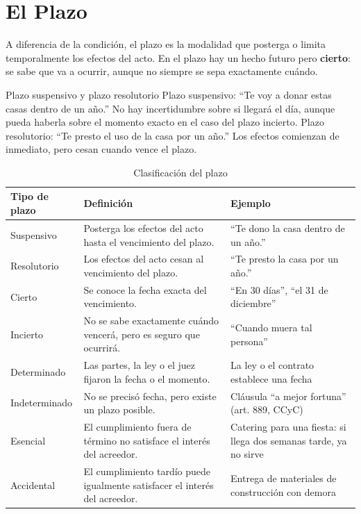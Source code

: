 \documentclass[12pt,oneside]{book}
\begin{document}
\section{El Plazo}

A diferencia de la condición, el plazo es la modalidad que posterga o limita temporalmente los efectos del acto. En el plazo hay un hecho futuro pero \textbf{cierto}: se sabe que va a ocurrir, aunque no siempre se sepa exactamente cuándo.

\begin{example}{Plazo suspensivo y plazo resolutorio}
Plazo suspensivo: ``Te voy a donar estas casas dentro de un año.'' No hay incertidumbre sobre si llegará el día, aunque pueda haberla sobre el momento exacto en el caso del plazo incierto. Plazo resolutorio: ``Te presto el uso de la casa por un año.'' Los efectos comienzan de inmediato, pero cesan cuando vence el plazo.
\end{example}

\begin{table}[H]
\centering
\begin{tabularx}{\textwidth}{l X X}
\toprule
\textbf{Tipo de plazo} & \textbf{Definición} & \textbf{Ejemplo} \\
\midrule
Suspensivo & Posterga los efectos del acto hasta el vencimiento del plazo. & ``Te dono la casa dentro de un año.'' \\
Resolutorio & Los efectos del acto cesan al vencimiento del plazo. & ``Te presto la casa por un año.'' \\
Cierto & Se conoce la fecha exacta del vencimiento. & ``En 30 días'', ``el 31 de diciembre'' \\
Incierto & No se sabe exactamente cuándo vencerá, pero es seguro que ocurrirá. & ``Cuando muera tal persona'' \\
Determinado & Las partes, la ley o el juez fijaron la fecha o el momento. & La ley o el contrato establece una fecha \\
Indeterminado & No se precisó fecha, pero existe un plazo posible. & Cláusula ``a mejor fortuna'' (art. 889, CCyC) \\
Esencial & El cumplimiento fuera de término no satisface el interés del acreedor. & Catering para una fiesta: si llega dos semanas tarde, ya no sirve \\
Accidental & El cumplimiento tardío puede igualmente satisfacer el interés del acreedor. & Entrega de materiales de construcción con demora \\
\bottomrule
\end{tabularx}
\caption{Clasificación del plazo}
\end{table}
\end{document}
